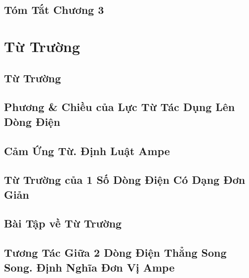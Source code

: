 \documentclass[oneside]{book}
\numberwithin{equation}{section}
\begin{document}

\section{Tóm Tắt Chương 3}


\chapter{Từ Trường}

\section{Từ Trường}


\section{Phương \& Chiều của Lực Từ Tác Dụng Lên Dòng Điện}


\section{Cảm Ứng Từ. Định Luật Ampe}


\section{Từ Trường của 1 Số Dòng Điện Có Dạng Đơn Giản}


\section{Bài Tập về Từ Trường}


\section{Tương Tác Giữa 2 Dòng Điện Thẳng Song Song. Định Nghĩa Đơn Vị Ampe}
\end{document}

